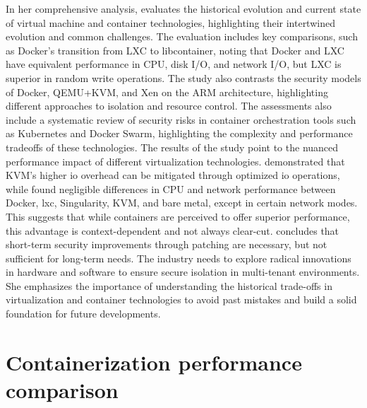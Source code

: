 In her comprehensive analysis, \citet{randalIdealRealRevisiting2021} evaluates the historical evolution and current state of virtual machine and container technologies, highlighting their intertwined evolution and common challenges.
The evaluation includes key comparisons, such as Docker's transition from LXC to libcontainer, noting that Docker and LXC have equivalent performance in CPU, disk I/O, and network I/O, but LXC is superior in random write operations.
The study also contrasts the security models of Docker, QEMU+KVM, and Xen on the ARM architecture, highlighting different approaches to isolation and resource control.
The assessments also include a systematic review of security risks in container orchestration tools such as Kubernetes and Docker Swarm, highlighting the complexity and performance tradeoffs of these technologies.
The results of the study point to the nuanced performance impact of different virtualization technologies. \citet{felterUpdatedPerformanceComparison2015} demonstrated that KVM's higher \ac{io} overhead can be mitigated through optimized \ac{io} operations, while \citet{kovacsComparisonDifferentLinux2017} found negligible differences in CPU and network performance between Docker, \ac{lxc}, Singularity, KVM, and bare metal, except in certain network modes.
This suggests that while containers are perceived to offer superior performance, this advantage is context-dependent and not always clear-cut.
\citet{randalIdealRealRevisiting2021} concludes that short-term security improvements through patching are necessary, but not sufficient for long-term needs.
The industry needs to explore radical innovations in hardware and software to ensure secure isolation in multi-tenant environments.
She emphasizes the importance of understanding the historical trade-offs in virtualization and container technologies to avoid past mistakes and build a solid foundation for future developments.

\section{Containerization performance comparison}

